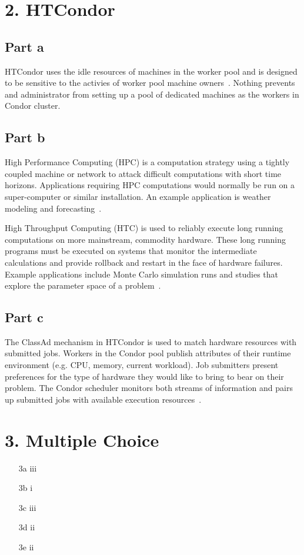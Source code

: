 \documentclass[12pt]{article}
\begin{document}
\section*{2. HTCondor}
\subsection*{Part a}
HTCondor uses the idle resources of machines in the worker pool and is
designed to be sensitive to the activies of worker pool machine
owners~\cite{condor-man}.  Nothing prevents and administrator from
setting up a pool of dedicated machines as the workers in Condor
cluster.


\subsection*{Part b}
High Performance Computing (HPC) is a computation strategy using a
tightly coupled machine or network to attack difficult computations
with short time horizons. Applications requiring HPC computations
would normally be run on a super-computer or similar installation.  An
example application is weather modeling and forecasting~\cite{hpcwire}.

High Throughput Computing (HTC) is used to reliably execute long
running computations on more mainstream, commodity hardware.  These
long running programs must be executed on systems that monitor the
intermediate calculations and provide rollback and restart in the face
of hardware failures.  Example applications include Monte Carlo
simulation runs and studies that explore the parameter space of a
problem~\cite{hpcwire}.

\subsection*{Part c}
The ClassAd mechanism in HTCondor is used to match hardware resources
with submitted jobs.  Workers in the Condor pool publish attributes of
their runtime environment (e.g. CPU, memory, current workload). Job
submitters present preferences for the type of hardware they would
like to bring to bear on their problem.  The Condor scheduler monitors
both streams of information and pairs up submitted jobs with available
execution resources~\cite{condor-man}.

\section*{3. Multiple Choice}

  \begin{itemize}
  \item[3a] iii
  \item[3b] i
  \item[3c] iii
  \item[3d] ii
  \item[3e] ii
\end{itemize}




\end{document}
